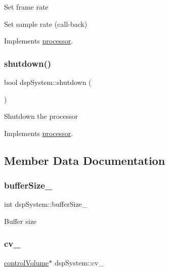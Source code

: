 Set frame rate

Set sample rate (call-\/back) 

Implements \hyperlink{classprocessor_afd94390f689bf421808cd413643befcf}{processor}.

\mbox{\label{classdspSystem_aaeee5d8676285bbb2402739edabe5d09}} 
\subsubsection{\texorpdfstring{shutdown()}{shutdown()}}
{\footnotesize\ttfamily bool dsp\+System\+::shutdown (\begin{DoxyParamCaption}{ }\end{DoxyParamCaption})\hspace{0.3cm}{\ttfamily [virtual]}}

Shutdown the processor 

Implements \hyperlink{classprocessor_aad3c0afc61e81dbf9cce91d358dca0bd}{processor}.



\subsection{Member Data Documentation}
\mbox{\label{classdspSystem_a0875e23a2ff73938f0f44ee6c0ef88dd}} 
\subsubsection{\texorpdfstring{buffer\+Size\+\_\+}{bufferSize\_}}
{\footnotesize\ttfamily int dsp\+System\+::buffer\+Size\+\_\+\hspace{0.3cm}{\ttfamily [protected]}}

Buffer size \mbox{\label{classdspSystem_ab2b833fc01ee4ca4ba12ee9b1682b03f}} 
\subsubsection{\texorpdfstring{cv\+\_\+}{cv\_}}
{\footnotesize\ttfamily \hyperlink{classcontrolVolume}{control\+Volume}$\ast$ dsp\+System\+::cv\+\_\+\hspace{0.3cm}{\ttfamily [protected]}}

